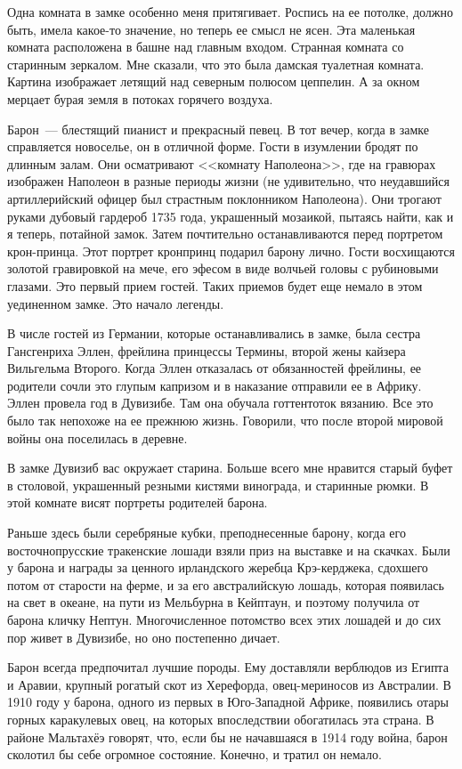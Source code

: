 \documentclass[12pt,a4paper,twoside,openany,svgnames]{memoir}
\begin{document}
Одна комната в замке особенно меня притягивает. Роспись на ее потолке, должно быть, имела какое-то значение, но теперь ее смысл не ясен. Эта маленькая комната расположена в башне над главным входом. Странная комната со старинным зеркалом. Мне сказали, что это была дамская туалетная комната. Картина изображает летящий над северным полюсом цеппелин. А за окном мерцает бурая земля в потоках горячего воздуха.

Барон~--- блестящий пианист и прекрасный певец. В тот вечер, когда в замке справляется новоселье, он в отличной форме. Гости в изумлении бродят по длинным залам. Они осматривают <<комнату Наполеона>>, где на гравюрах изображен Наполеон в разные периоды жизни (не удивительно, что неудавшийся артиллерийский офицер был страстным поклонником Наполеона). Они трогают руками дубовый гардероб 1735 года, украшенный мозаикой, пытаясь найти, как и я теперь, потайной замок. Затем почтительно останавливаются перед портретом крон-принца. Этот портрет кронпринц подарил барону лично. Гости восхищаются золотой гравировкой на мече, его эфесом в виде волчьей головы с рубиновыми глазами. Это первый прием гостей. Таких приемов будет еще немало в этом уединенном замке. Это начало легенды.

В числе гостей из Германии, которые останавливались в замке, была сестра Гансгенриха Эллен, фрейлина принцессы Термины, второй жены кайзера Вильгельма Второго. Когда Эллен отказалась от обязанностей фрейлины, ее родители сочли это глупым капризом и в наказание отправили ее в Африку. Эллен провела год в Дувизибе. Там она обучала готтентоток вязанию. Все это было так непохоже на ее прежнюю жизнь. Говорили, что после второй мировой войны она поселилась в деревне.

В замке Дувизиб вас окружает старина. Больше всего мне нравится старый буфет в столовой, украшенный резными кистями винограда, и старинные рюмки. В этой комнате висят портреты родителей барона.

Раньше здесь были серебряные кубки, преподнесенные барону, когда его восточнопрусские тракенские лошади взяли приз на выставке и на скачках. Были у барона и награды за ценного ирландского жеребца Крэ-керджека, сдохшего потом от старости на ферме, и за его австралийскую лошадь, которая появилась на свет в океане, на пути из Мельбурна в Кейптаун, и поэтому получила от барона кличку Нептун. Многочисленное потомство всех этих лошадей и до сих пор живет в Дувизибе, но оно постепенно дичает.

Барон всегда предпочитал лучшие породы. Ему доставляли верблюдов из Египта и Аравии, крупный рогатый скот из Херефорда, овец-мериносов из Австралии. В 1910 году у барона, одного из первых в Юго-Западной Африке, появились отары горных каракулевых овец, на которых впоследствии обогатилась эта страна. В районе Мальтахёэ говорят, что, если бы не начавшаяся в 1914 году война, барон сколотил бы себе огромное состояние. Конечно, и тратил он немало.
\end{document}
